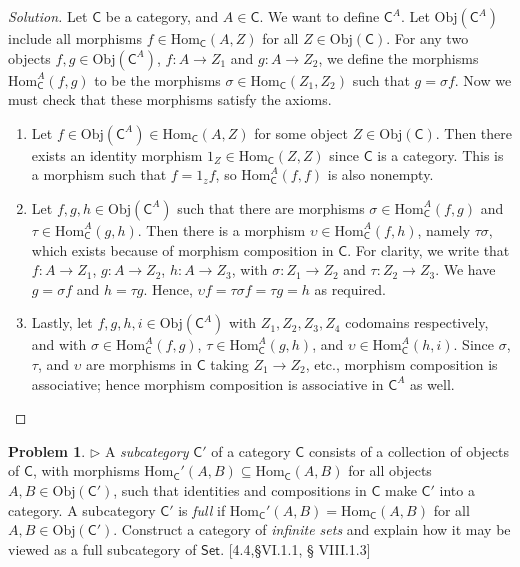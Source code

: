 \documentclass[fontsize=14pt]{scrartcl}
\theoremstyle{definition}
\newtheorem{problem-internal}{Problem}[subsection]
\newenvironment{problem}{
  \medskip
  \begin{problem-internal}
}{
  \end{problem-internal}
}
\newenvironment{solution}{
  \begin{proof}[Solution]
  \vspace{-8px}
  \setlength{\parskip}{4px}
  \setlength{\parindent}{0px}
}{
  \end{proof}
}
\newcommand{\Obj}{\mathrm{Obj}}
\newcommand{\Hom}{\mathrm{Hom}}
\begin{document}
\begin{solution}
\def \C {\mathsf{C}}
\def \CA {\mathsf{C}^A}

Let $\C$ be a category, and $A\in\C$. We want to define $\CA$. Let $\Obj(\CA)$
include all morphisms $f\in\Hom_\C(A,Z)$ for all $Z\in\Obj(\C)$. For any two
objects $f,g\in\Obj(\CA)$, $f:A\to Z_1$ and $g:A\to Z_2$, we define the
morphisms $\Hom_\CA(f,g)$ to be the morphisms $\sigma\in\Hom_\C(Z_1, Z_2)$ such
that $g=\sigma f$. Now we must check that these morphisms satisfy the axioms.

\begin{enumerate}
\item Let $f\in\Obj(\CA)\in\Hom_\C(A,Z)$ for some object $Z\in\Obj(\C)$. Then
there exists an identity morphism $1_Z\in\Hom_\C(Z,Z)$ since $\C$ is a category.
This is a morphism such that $f=1_zf$, so $\Hom_\CA(f,f)$ is also nonempty.

\item Let $f,g,h\in\Obj(\CA)$ such that there are morphisms
$\sigma\in\Hom_\CA(f,g)$ and $\tau\in\Hom_\CA(g,h)$. Then there is a morphism
$\upsilon\in\Hom_\CA(f,h)$, namely $\tau\sigma$, which exists because of
morphism composition in $\C$. For clarity, we write that  $f:A\to Z_1$, $g:A\to
Z_2$, $h:A\to Z_3$, with $\sigma:Z_1\to Z_2$ and $\tau:Z_2\to Z_3$. We have
$g=\sigma f$ and $h=\tau g$. Hence, $\upsilon f = \tau\sigma f = \tau g = h$ as
required.

\item Lastly, let $f,g,h,i\in\Obj(\CA)$ with $Z_1, Z_2, Z_3, Z_4$ codomains
respectively, and with $\sigma\in\Hom_\CA(f,g)$, $\tau\in\Hom_\CA(g,h)$, and
$\upsilon\in\Hom_\CA(h,i)$. Since $\sigma$, $\tau$, and $\upsilon$ are morphisms
in $\C$ taking $Z_1\to Z_2$, etc., morphism composition is associative; hence
morphism composition is associative in $\CA$ as well.
\end{enumerate}
\end{solution}


\begin{problem}
\def \C {\mathsf{C}}
\def \Cp {\C'}

$\rhd$ A \textit{subcategory} $\Cp$ of a category $\C$ consists of a
collection of objects of $\C$, with morphisms
$\Hom_\Cp(A,B) \subseteq \Hom_\C(A,B)$ for all objects $A,B\in\Obj(\Cp)$, such
that identities and compositions in $\C$ make $\Cp$ into a category. A
subcategory $\Cp$ is \textit{full} if $\Hom_\Cp(A,B) = \Hom_\C(A,B)$ for all
$A,B\in\Obj(\Cp)$. Construct a category of \textit{infinite sets} and explain
how it may be viewed as a full subcategory of $\mathsf{Set}$. [4.4,\S VI.1.1, \S
VIII.1.3]
\end{problem}
\end{document}
